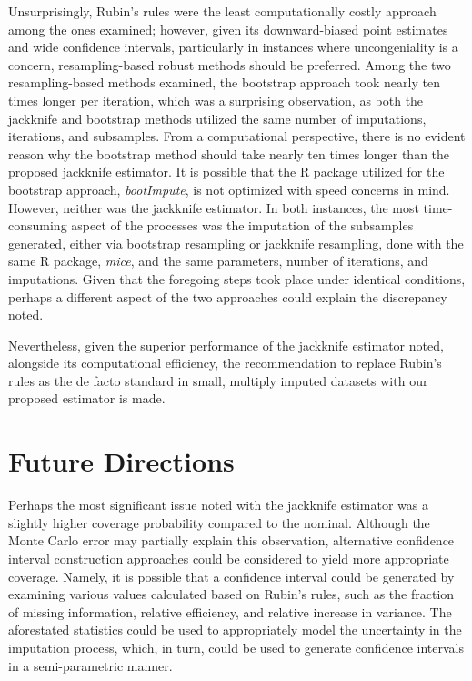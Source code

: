 \documentclass[
  letterpaper,
  DIV=11,
  numbers=noendperiod]{scrreprt}
\begin{document}
Unsurprisingly, Rubin's rules were the least computationally costly
approach among the ones examined; however, given its downward-biased
point estimates and wide confidence intervals, particularly in instances
where uncongeniality is a concern, resampling-based robust methods
should be preferred. Among the two resampling-based methods examined,
the bootstrap approach took nearly ten times longer per iteration, which
was a surprising observation, as both the jackknife and bootstrap
methods utilized the same number of imputations, iterations, and
subsamples. From a computational perspective, there is no evident reason
why the bootstrap method should take nearly ten times longer than the
proposed jackknife estimator. It is possible that the R package utilized
for the bootstrap approach, \emph{bootImpute}, is not optimized with
speed concerns in mind. However, neither was the jackknife estimator. In
both instances, the most time-consuming aspect of the processes was the
imputation of the subsamples generated, either via bootstrap resampling
or jackknife resampling, done with the same R package, \emph{mice}, and
the same parameters, number of iterations, and imputations. Given that
the foregoing steps took place under identical conditions, perhaps a
different aspect of the two approaches could explain the discrepancy
noted.

Nevertheless, given the superior performance of the jackknife estimator
noted, alongside its computational efficiency, the recommendation to
replace Rubin's rules as the de facto standard in small, multiply
imputed datasets with our proposed estimator is made.

\hypertarget{future-directions}{%
\section{Future Directions}\label{future-directions}}

Perhaps the most significant issue noted with the jackknife estimator
was a slightly higher coverage probability compared to the nominal.
Although the Monte Carlo error may partially explain this observation,
alternative confidence interval construction approaches could be
considered to yield more appropriate coverage. Namely, it is possible
that a confidence interval could be generated by examining various
values calculated based on Rubin's rules, such as the fraction of
missing information, relative efficiency, and relative increase in
variance. The aforestated statistics could be used to appropriately
model the uncertainty in the imputation process, which, in turn, could
be used to generate confidence intervals in a semi-parametric manner.
\end{document}

